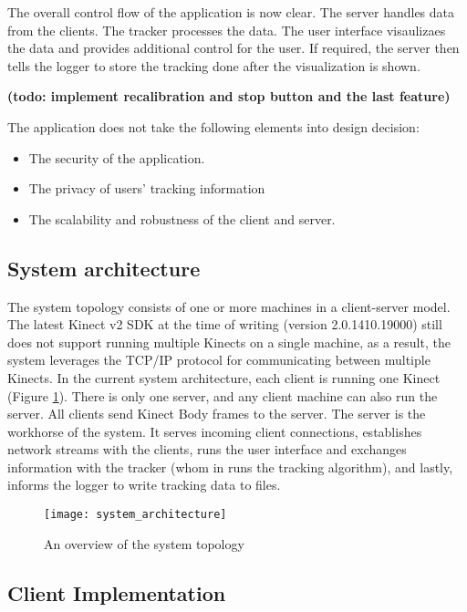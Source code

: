 The overall control flow of the application is now clear. The server handles data from the clients. The tracker processes the data. The user interface visaulizaes the data and provides additional control for the user. If required, the server then tells the logger to store the tracking done after the visualization is shown.

\textbf{(todo: implement recalibration and stop button and the last feature)}

The application does not take the following elements into design decision:

\begin{itemize}
  \item The security of the application.
  \item The privacy of users' tracking information
  \item The scalability and robustness of the client and server.
\end{itemize}

\subsection{System architecture}

The system topology consists of one or more machines in a client-server model. The latest Kinect v2 SDK at the time of writing (version 2.0.1410.19000) still does not support running multiple Kinects on a single machine, as a result, the system leverages the TCP/IP protocol for communicating between multiple Kinects. In the current system architecture, each client is running one Kinect (Figure \ref{fig:system_architecture}). There is only one server, and any client machine can also run the server. All clients send Kinect Body frames to the server. The server is the workhorse of the system. It serves incoming client connections, establishes network streams with the clients, runs the user interface and exchanges information with the tracker (whom in runs the tracking algorithm), and lastly, informs the logger to write tracking data to files.

\begin{figure}[h!]
  \centering
  \texttt{[image: system\_architecture]}
  \caption{An overview of the system topology}
  \label{fig:system_architecture}
\end{figure}

\subsection{Client Implementation}


